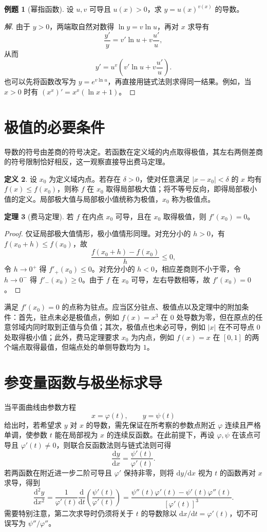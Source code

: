 \documentclass[UTF8,fontset=fandol,a4paper,12pt]{ctexart}
\newcommand{\dd}{\mathrm d}
\theoremstyle{definition}
\newtheorem{definition}{定义}[section]
\newtheorem{theorem}[definition]{定理}
\newtheorem{example}[definition]{例题}
\begin{document}
\begin{example}[幂指函数]
设 $u,v$ 可导且 $u(x)>0$，求 $y=u(x)^{v(x)}$ 的导数。
\end{example}
\begin{proof}[解]
由于 $y>0$，两端取自然对数得 $\ln y=v\ln u$，再对 $x$ 求导有
\[
 \frac{y'}y=v'\ln u+v\frac{u'}u,
\]
从而
\[
 \boxed{y'=u^v\left(v'\ln u+v\frac{u'}u\right).}
\]
也可以先将函数改写为 $y=e^{v\ln u}$，再直接用链式法则求得同一结果。例如，当 $x>0$ 时有 $(x^x)'=x^x(\ln x+1)$。
\end{proof}

\section{极值的必要条件}
导数的符号由差商的符号决定。若函数在定义域的内点取得极值，其左右两侧差商的符号限制恰好相反，这一观察直接导出费马定理。

\begin{definition}
设 $x_0$ 为定义域内点。若存在 $\delta>0$，使对任意满足 $|x-x_0|<\delta$ 的 $x$ 均有 $f(x)\le f(x_0)$，则称 $f$ 在 $x_0$ 取得局部极大值；将不等号反向，即得局部极小值的定义。局部极大值与局部极小值统称为极值，$x_0$ 称为极值点。
\end{definition}

\begin{theorem}[费马定理]
若 $f$ 在内点 $x_0$ 可导，且在 $x_0$ 取得极值，则 $f'(x_0)=0$。
\end{theorem}
\begin{proof}
仅证局部极大值情形，极小值情形同理。对充分小的 $h>0$，有 $f(x_0+h)\le f(x_0)$，故
\[
 \frac{f(x_0+h)-f(x_0)}h\le0,
\]
令 $h\to0^+$ 得 $f'_+(x_0)\le0$。对充分小的 $h<0$，相应差商则不小于零，令 $h\to0^-$ 得 $f'_-(x_0)\ge0$。由于 $f$ 在 $x_0$ 可导，左右导数相等，故 $f'(x_0)=0$。
\end{proof}

满足 $f'(x_0)=0$ 的点称为驻点。应当区分驻点、极值点以及定理中的附加条件：首先，驻点未必是极值点，例如 $f(x)=x^3$ 在 $0$ 处导数为零，但在原点的任意邻域内同时取到正值与负值；其次，极值点也未必可导，例如 $|x|$ 在不可导点 $0$ 处取得极小值；此外，费马定理要求 $x_0$ 为内点，例如 $f(x)=x$ 在 $[0,1]$ 的两个端点取得最值，但端点处的单侧导数均为 $1$。

\section{参变量函数与极坐标求导}
当平面曲线由参数方程
\[
 x=\varphi(t),\qquad y=\psi(t)
\]
给出时，若希望求 $y$ 对 $x$ 的导数，需先保证在所考察的参数点附近 $\varphi$ 连续且严格单调，使参数 $t$ 能在局部视为 $x$ 的连续反函数。在此前提下，再设 $\varphi,\psi$ 在该点可导且 $\varphi'(t)\ne0$，则联合反函数法则与链式法则可得
\[
 \boxed{\frac{\dd y}{\dd x}=\frac{\psi'(t)}{\varphi'(t)}.}
\]
若两函数在附近进一步二阶可导且 $\varphi'$ 保持非零，则将 $\dd y/\dd x$ 视为 $t$ 的函数再对 $x$ 求导，得到
\[
 \boxed{\frac{\dd^2y}{\dd x^2}
 =\frac1{\varphi'(t)}\frac{\dd}{\dd t}
 \left(\frac{\psi'(t)}{\varphi'(t)}\right)
 =\frac{\psi''(t)\varphi'(t)-\psi'(t)\varphi''(t)}{[\varphi'(t)]^3}.}
\]
需要特别注意，第二次求导时仍须将关于 $t$ 的导数除以 $\dd x/\dd t=\varphi'(t)$，切不可误写为 $\psi''/\varphi''$。
\end{document}
